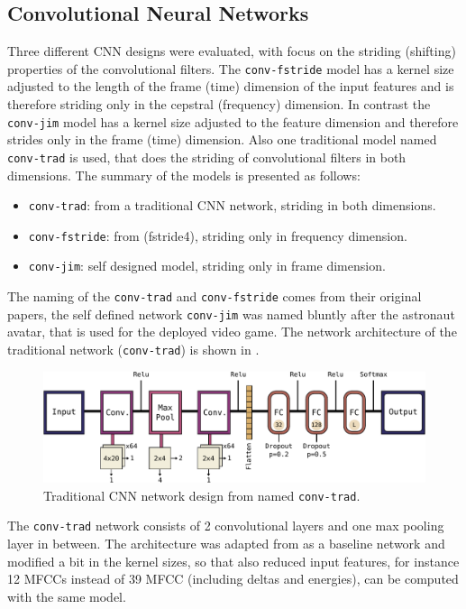 \subsection{Convolutional Neural Networks}\label{sec:nn_arch_cnn}
Three different CNN designs were evaluated, with focus on the striding (shifting) properties of the convolutional filters.
The \texttt{conv-fstride} model has a kernel size adjusted to the length of the frame (time) dimension of the input features and is therefore striding only in the cepstral (frequency) dimension.
In contrast the \texttt{conv-jim} model has a kernel size adjusted to the feature dimension and therefore strides only in the frame (time) dimension.
Also one traditional model named \texttt{conv-trad} is used, that does the striding of convolutional filters in both dimensions.
The summary of the models is presented as follows:
\begin{itemize}
	\item \texttt{conv-trad}: from \cite{Sainath2015} a traditional CNN network, striding in both dimensions.
	\item \texttt{conv-fstride}: from \cite{Sainath2015} (fstride4), striding only in frequency dimension.
	\item \texttt{conv-jim}: self designed model, striding only in frame dimension.
\end{itemize}
The naming of the \texttt{conv-trad} and \texttt{conv-fstride} comes from their original papers, the self defined network \texttt{conv-jim} was named bluntly after the astronaut avatar, that is used for the deployed video game.
The network architecture of the traditional network (\texttt{conv-trad}) is shown in .
\begin{figure}[!ht]
  \centering
    \includegraphics[height=0.2\textwidth]{./4_nn/figs/nn_arch_cnn_trad.pdf}
  \caption{Traditional CNN network design from \cite{Sainath2015} named \texttt{conv-trad}.}
  \label{fig:nn_arch_cnn_trad}
\end{figure}
\FloatBarrier
\noindent
The \texttt{conv-trad} network consists of 2 convolutional layers and one max pooling layer in between.
The architecture was adapted from \cite{Sainath2015} as a baseline network and modified a bit in the kernel sizes, so that also reduced input features, for instance 12 MFCCs instead of 39 MFCC (including deltas and energies), can be computed with the same model.

